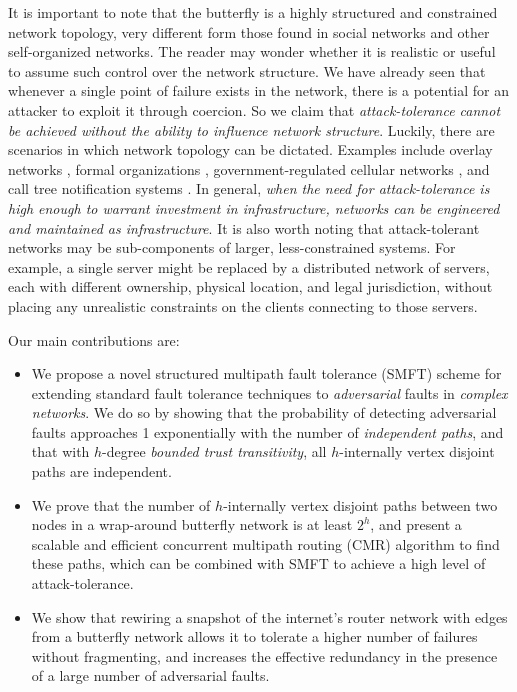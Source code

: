 \documentclass[10pt,letterpaper]{article}
\begin{document}
It is important to note that the butterfly is a highly structured and constrained
network topology,
very different form those found in social networks and other
self-organized networks.
The reader may wonder whether it is realistic or useful to assume such control over
the network structure.
We have already seen that whenever a single point of failure exists in the network,
there is a potential for an attacker to exploit it through coercion.
So we claim that {\em attack-tolerance cannot be achieved without the ability to influence
network structure}.
Luckily, there are scenarios in which network topology can be dictated.
Examples include overlay networks
\cite{lua_survey_2005, korzun_structured_2013},
formal organizations \cite{mohr_explaining_1982},
government-regulated cellular networks \cite{walker_mass_2012},
and call tree notification systems \cite{nickerson_thinking_2010}.
In general,
{\em when the need for attack-tolerance is high enough to warrant investment
in infrastructure, networks can be engineered and maintained as infrastructure}.
It is also worth noting that attack-tolerant networks may be sub-components of
larger, less-constrained systems.
For example, a single server might be replaced by a distributed network of servers,
each with different ownership, physical location, and legal jurisdiction,
without placing any unrealistic constraints on the clients connecting to
those servers.

Our main contributions are:
\begin{itemize}
\item{
We propose a novel structured multipath fault tolerance (SMFT) scheme
for extending standard fault tolerance techniques to
{\em adversarial} faults in {\em complex networks}.
We do so by showing that the probability of detecting adversarial faults
approaches 1 exponentially with the number of {\em independent paths},
and that with $h$-degree {\em bounded trust transitivity},
all $h$-internally vertex disjoint paths are independent.
}
\item{We prove that the number of $h$-internally vertex disjoint
paths between two nodes in a wrap-around butterfly network
is at least $2^h$,
and present a scalable and efficient concurrent multipath routing (CMR) algorithm
to find these paths,
which can be combined with SMFT to achieve a high level of attack-tolerance.
}
\item{We show that rewiring a snapshot of the internet's router network with
edges from a butterfly network allows it to tolerate a higher number of failures
without fragmenting, and increases the effective redundancy in the presence
of a large number of adversarial faults.}
\end{itemize}
\end{document}
